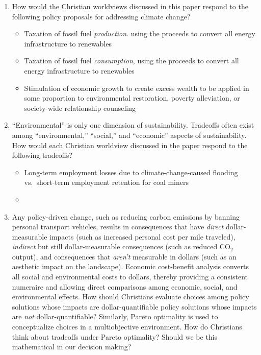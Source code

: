 \documentclass[12pt]{article}
\begin{document}
\begin{enumerate}
\begin{itemize}
\begin{itemize}
          \end{itemize} 
				
		\end{itemize}
  \item How would the Christian worldviews discussed in this paper 
		respond to the following policy proposals
		for addressing climate change?
		\begin{itemize}

		  \item Taxation of fossil fuel \emph{production}. using the proceeds to 
		        convert all energy infrastructure to renewables
		  
		  \item Taxation of fossil fuel \emph{consumption}, using the proceeds to 
		        convert all energy infrastructure to renewables

		  \item Stimulation of economic growth to create excess wealth to be applied 
		        in some proportion to environmental restoration, poverty alleviation,  
				or society-wide relationship counseling

		\end{itemize}
  \item ``Environmental'' is only one dimension of sustainability. 
        Tradeoffs often exist among ``environmental,'' ``social,'' and ``economic'' 
		aspects of sustainability. 
		How would each Christian worldview discussed in the paper respond to the following tradeoffs?
		\begin{itemize}

		  \item Long-term employment losses due to climate-change-caused flooding vs.\ 
		        short-term employment retention for coal miners

		  \item 

		\end{itemize}
  \item Any policy-driven change, 
        such as reducing carbon emissions by banning personal transport vehicles, 
		results in consequences that have 
		\emph{direct} dollar-measurable impacts 
		(such as increased personal cost per mile traveled),
		\emph{indirect} but still dollar-measurable consequences 
		(such as reduced CO$_2$ output), and 
		consequences that \emph{aren't} measurable in dollars 
		(such as an aesthetic impact on the landscape). 
		Economic cost-benefit analysis converts all social and environmental costs 
		to dollars, thereby providing a consistent numeraire and allowing direct comparisons
		among economic, social, and environmental effects. 
		How should Christians evaluate choices among 
		policy solutions whose impacts are dollar-quantifiable
		policy solutions whose impacts are \emph{not} dollar-quantifiable?
		Similarly, Pareto optimality is used to conceptualize choices in a multiobjective environment. 
		How do Christians think about tradeoffs under Pareto optimality? 
		Should we be this mathematical in our decision making?


\end{enumerate}
\end{document}
